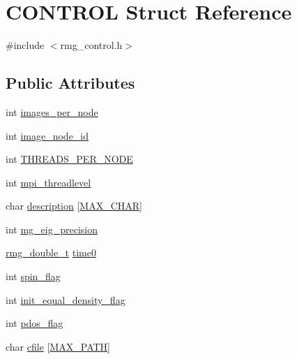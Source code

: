 \hypertarget{struct_c_o_n_t_r_o_l}{\section{C\-O\-N\-T\-R\-O\-L Struct Reference}
\label{struct_c_o_n_t_r_o_l}
}


{\ttfamily \#include $<$rmg\-\_\-control.\-h$>$}

\subsection*{Public Attributes}
\begin{DoxyCompactItemize}
\item 
int \hyperlink{struct_c_o_n_t_r_o_l_a8fa49b12c64048ae5dff0df20e6ca6ea}{images\-\_\-per\-\_\-node}
\item 
int \hyperlink{struct_c_o_n_t_r_o_l_a481526fba82192706357a730e0807470}{image\-\_\-node\-\_\-id}
\item 
int \hyperlink{struct_c_o_n_t_r_o_l_ae4d48a7df73459bc0c701c5913d33a6e}{T\-H\-R\-E\-A\-D\-S\-\_\-\-P\-E\-R\-\_\-\-N\-O\-D\-E}
\item 
int \hyperlink{struct_c_o_n_t_r_o_l_aa5d688bb8970dfa2714dd2b938478165}{mpi\-\_\-threadlevel}
\item 
char \hyperlink{struct_c_o_n_t_r_o_l_a75fcf45df060b8e11ce24859832b183b}{description} \mbox{[}\hyperlink{_t_d_d_f_t_2_headers_2params_8h_a82acb32225c05e9aa4c524c40bc5852a}{M\-A\-X\-\_\-\-C\-H\-A\-R}\mbox{]}
\item 
int \hyperlink{struct_c_o_n_t_r_o_l_ad64d411440664c7218e15722338ed4fb}{mg\-\_\-eig\-\_\-precision}
\item 
\hyperlink{rmgtypes_8h_aaa16921c14f121c56eaa42390a340db8}{rmg\-\_\-double\-\_\-t} \hyperlink{struct_c_o_n_t_r_o_l_a2fe70e675f28e7a8b9b81cc876835c60}{time0}
\item 
int \hyperlink{struct_c_o_n_t_r_o_l_a3e808787eb0000d896043edffcea3e60}{spin\-\_\-flag}
\item 
int \hyperlink{struct_c_o_n_t_r_o_l_ac9f884c0b7ef1f987681625ba063fc91}{init\-\_\-equal\-\_\-density\-\_\-flag}
\item 
int \hyperlink{struct_c_o_n_t_r_o_l_a5f65a33b1576c18bf22bb43063fd53f1}{pdos\-\_\-flag}
\item 
char \hyperlink{struct_c_o_n_t_r_o_l_a043a69ab74c88566115800df9cffc2f1}{cfile} \mbox{[}\hyperlink{_t_d_d_f_t_2_headers_2params_8h_ab99ded389af74001a6298fc9e44e74e5}{M\-A\-X\-\_\-\-P\-A\-T\-H}\mbox{]}
\item 

\end{DoxyCompactItemize}
